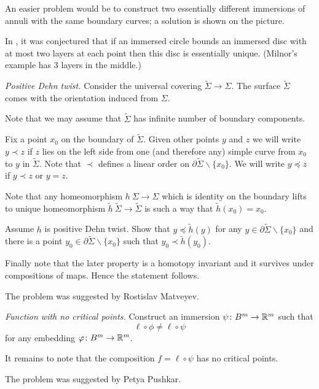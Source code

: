 An easier problem would be to construct two essentially different immersions of annuli with the same boundary curves; a solution is shown on the picture.

In \cite{shor-van wyk}, it was conjectured that 
if an immersed circle bounds an immersed disc with at most two layers at each point then this disc is essentially unique. (Milnor's example has 3 layers in the middle.)


\textit{Positive Dehn twist.}
Consider the universal covering 
$\tilde\Sigma\to\Sigma$.
The surface $\tilde \Sigma$ comes with the orientation induced from $\Sigma$.

Note that we may assume that $\tilde\Sigma$ has infinite number of boundary components.

Fix a point $x_0$ on the boundary of $\tilde \Sigma$.
Given other points $y$ and $z$ we will write
$y\prec z$ if $z$ lies on the left side from one (and therefore any) simple curve from $x_0$ to $y$ in $\tilde\Sigma$.
Note that  $\prec$ defines a linear order on $\partial\tilde\Sigma\backslash\{x_0\}$.
We will write $y\preceq z$ 
if $y\prec z$ or $y=z$.

Note that any homeomorphism $h\:\Sigma\to\Sigma$ which is identity on the boundary
lifts to unique homeomorphism $\tilde h\:\tilde \Sigma\to\tilde\Sigma$ 
is such a way that $\tilde h(x_0)=x_0$.

Assume $h$ is positive Dehn twist.
Show that 
$y\preceq \tilde h(y)$ for any  $y\in\partial\tilde\Sigma\backslash\{x_0\}$
and there is a point $y_0\in\partial\tilde\Sigma\backslash\{x_0\}$
such that $y_0\prec \tilde h(y_0)$.

Finally note that the later property is a homotopy invariant 
and it survives under compositions of maps.
Hence the statement follows.

 The problem was suggested by Rostislav Matveyev.

\textit{Function with no critical points.}
Construct an immersion $\psi\:B^m\z\to\RR^m$ such that 
\[\ell\circ\phi\ne\ell\circ\psi\]
for any embedding  $\varphi\colon B^m\to\mathbb{R}^m$.

It remains to note that the composition $f=\ell\circ\psi$ has no critical points.

The problem was suggested by Petya Pushkar.

